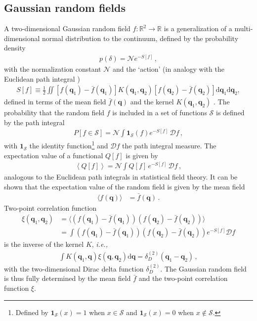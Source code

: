 \documentclass[a4paper, 11pt]{article}
\begin{document}
\subsection{Gaussian random fields}
A two-dimensional Gaussian random field $f:\mathbb{R}^2\to \mathbb{R}$ is a generalization of a multi-dimensional normal distribution to the continuum, defined by the probability density
\begin{align}
p(\delta) = \mathcal{N} e^{- S[f]}\,, \label{eq:functional_Distribution}
\end{align}
with the normalization constant $\mathcal{N}$ and the `action' (in analogy with the Euclidean path integral \cite{Feynman:1965})
\begin{align}
S[f]\equiv \frac{1}{2} \iint [f(\bm{q}_1) - \bar{f}(\bm{q}_1)] K(\bm{q}_1,\bm{q}_2) [f(\bm{q}_2) -\bar{f}(\bm{q}_2)]\mathrm{d}\bm{q}_1 \mathrm{d}\bm{q}_2,\label{eq:action}
\end{align}
defined in terms of the mean field $\bar{f}(\bm{q})$ and the kernel $K(\bm{q}_1,\bm{q}_2)$ \cite{Longuet-Higgins:1957, Adler:1981, bbks:1986}. The probability that the random field $f$ is included in a set of functions $\mathcal{S}$ is defined by the path integral
\begin{align}
P[f \in \mathcal{S}] = \mathcal{N} \int \bm{1}_\mathcal{S}(f) e^{-S[f]}\,\mathcal{D}f\,,
\end{align}
with $\bm{1}_\mathcal{S}$ the identity function\footnote{Defined by $\bm{1}_\mathcal{S}(x)=1$ when $x \in \mathcal{S}$ and $\bm{1}_\mathcal{S}(x)=0$ when $x \notin \mathcal{S}$.} and $\mathcal{D}f$ the path integral measure. The expectation value of a functional $Q[f]$ is given by
\begin{align}
\left\langle Q[f] \right\rangle = \mathcal{N}\int Q[f]\, e^{-S[f]}\,\mathcal{D}f\,,
\end{align}
analogous to the Euclidean path integrals in statistical field theory. It can be shown that the expectation value of the random field is given by the mean field
\begin{align}
\langle f(\bm{q})\rangle &= \bar{f}(\bm{q})\,.
\end{align}
Two-point correlation function
\begin{align}
\xi(\bm{q}_1, \bm{q}_2) &= \langle (f(\bm{q}_1) - \bar{f}(\bm{q}_1)) (f(\bm{q}_2) - \bar{f}(\bm{q}_2))\rangle\nonumber\\
&= \int (f(\bm{q}_1) - \bar{f}(\bm{q}_1)) (f(\bm{q}_2) - \bar{f}(\bm{q}_2)) e^{-S[f]}\mathcal{D}f
\end{align}
is the inverse of the kernel $K$, \textit{i.e.,}
\begin{align}
\int K(\bm{q}_1,\bm{q}) \xi(\bm{q},\bm{q}_2) \mathrm{d}\bm{q}= \delta_D^{(2)}(\bm{q}_1-\bm{q}_2)\,,\label{eq:defK}
\end{align}
with the two-dimensional Dirac delta function $\delta_D^{(2)}$. The Gaussian random field is thus fully determined by the mean field $\bar{f}$ and the two-point correlation function $\xi$. 
\end{document}
